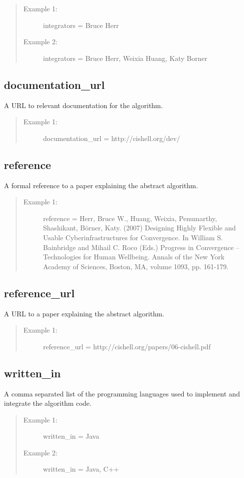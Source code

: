 \begin{quote}
\begin{description}
  \item[Example 1:] integrators = Bruce Herr
  \item[Example 2:] integrators = Bruce Herr, Weixia Huang, Katy Borner 
\end{description}
\end{quote}


\subsection*{documentation\_url}
A URL to relevant documentation for the algorithm.

\begin{quote}
\begin{description}
  \item[Example 1:] documentation\_url = http://cishell.org/dev/ 
\end{description}
\end{quote}


\subsection*{reference}
A formal reference to a paper explaining the abstract algorithm.

\begin{quote}
\begin{description}
  \item[Example 1:] reference = Herr, Bruce W., Huang, Weixia, Penumarthy,
  Shashikant, Börner, Katy. (2007) Designing Highly Flexible and Usable 
  Cyberinfrastructures for Convergence. In William S. Bainbridge and Mihail C. 
  Roco (Eds.) Progress in Convergence – Technologies for Human Wellbeing. 
  Annals of the New York Academy of Sciences, Boston, MA, volume 1093, pp. 161-179.
\end{description}
\end{quote}


\subsection*{reference\_url}
A URL to a paper explaining the abstract algorithm.

\begin{quote}
\begin{description}
  \item[Example 1:] reference\_url = http://cishell.org/papers/06-cishell.pdf 
\end{description}
\end{quote}


\subsection*{written\_in}
A comma separated list of the programming languages used to implement and
integrate the algorithm code.

\begin{quote}
\begin{description}
  \item[Example 1:] written\_in = Java
  \item[Example 2:] written\_in = Java, C++ 
\end{description}
\end{quote}
